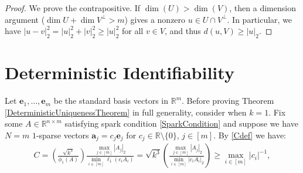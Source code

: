 \documentclass[journal, onecolumn]{IEEEtran}
\begin{document}
\begin{proof}
We prove the contrapositive.  If $\dim(U) > \dim(V)$, then a dimension argument ($\dim U + \dim V^\perp > m$) gives a nonzero $u \in U \cap V^\perp$.  In particular, we have $|u - v|_2^2 = |u|_2^2 + |v|_2^2 \geq |u|_2^2$ for all $v \in V$, and thus $d(u,V) \geq |u|_2$.
\end{proof}

\section{Deterministic Identifiability}\label{DUT}

Let $\mathbf{e}_1, \ldots, \mathbf{e}_m$ be the standard basis vectors in $\mathbb R^m$.
Before proving Theorem \ref{DeterministicUniquenessTheorem} in full generality, consider when $k=1$. Fix some $A \in \mathbb{R}^{n \times m}$ satisfying spark condition \eqref{SparkCondition} and suppose we have $N = m$ $1$-sparse vectors $\mathbf{a}_j = c_j \mathbf{e}_j$ for $c_j \in \mathbb{R} \setminus \{0\}$, $j \in [m]$. By \eqref{Cdef} we have:
\begin{align}\label{C1}
C = \left( \frac{ \sqrt{k^3}}{ \phi_1(A) } \right) \frac{\max_{j \in [m]} |A_j|_2}{\min_{i \in [m]} \ell_1(c_iA_i) }
= \sqrt{k^3} \left( \frac{\max_{j \in [m]} |A_j|_2}{\min_{i \in [m]}|c_iA_i|_2} \right)
\geq \max_{i \in [m]}|c_i|^{-1}, 
\end{align}
\end{document}
